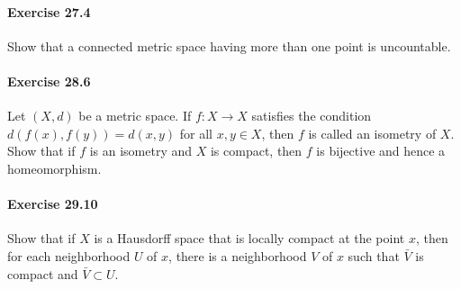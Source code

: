\documentclass{article}
\begin{document}
\paragraph{Exercise 27.4} Show that a connected metric space having more than one point is uncountable.

\paragraph{Exercise 28.6} Let $(X, d)$ be a metric space. If $f: X \rightarrow X$ satisfies the condition $d(f(x), f(y))=d(x, y)$ for all $x, y \in X$, then $f$ is called an isometry of $X$. Show that if $f$ is an isometry and $X$ is compact, then $f$ is bijective and hence a homeomorphism.

\paragraph{Exercise 29.10} Show that if $X$ is a Hausdorff space that is locally compact at the point $x$, then for each neighborhood $U$ of $x$, there is a neighborhood $V$ of $x$ such that $\bar{V}$ is compact and $\bar{V} \subset U$.
\end{document}
